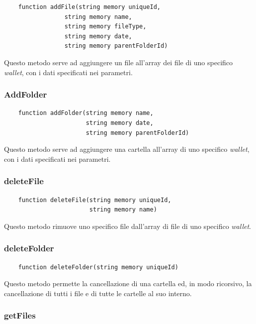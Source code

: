 \documentclass{article}
\begin{document}
\begin{lstlisting}
    function addFile(string memory uniqueId, 
                 string memory name, 
                 string memory fileType, 
                 string memory date, 
                 string memory parentFolderId) 
\end{lstlisting}

Questo metodo serve ad aggiungere un file all'array dei file di uno specifico \textit{wallet}, con i dati specificati nei parametri.

\subsubsection{AddFolder}

\begin{lstlisting}
    function addFolder(string memory name, 
                       string memory date, 
                       string memory parentFolderId) 
\end{lstlisting}

    Questo metodo serve ad aggiungere una cartella all'array di uno specifico \textit{wallet}, con i dati specificati nei parametri.
\subsubsection{deleteFile}
\begin{lstlisting}
    function deleteFile(string memory uniqueId,     
                        string memory name) 
\end{lstlisting}

Questo metodo rimuove uno specifico file dall'array di file di uno specifico \textit{wallet}.

\subsubsection{deleteFolder}

\begin{lstlisting}
    function deleteFolder(string memory uniqueId)
\end{lstlisting}

Questo metodo permette la cancellazione di una cartella ed, in modo ricorsivo, la cancellazione di tutti i file e di tutte le cartelle al suo interno.

\subsubsection{getFiles}
\end{document}
